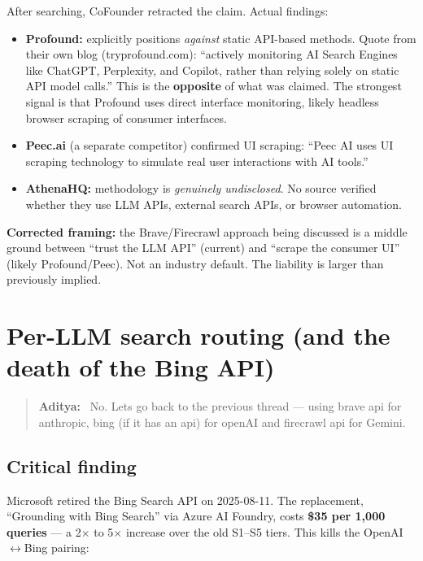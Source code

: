 \documentclass[11pt,letterpaper]{article}
\newenvironment{userturn}
  {\begin{quote}\small\color{brand}\textbf{Aditya:}~}
  {\end{quote}}
\begin{document}
After searching, CoFounder retracted the claim. Actual findings:

\begin{itemize}[nosep]
  \item \textbf{Profound:} explicitly positions \textit{against} static API-based methods.
    Quote from their own blog (tryprofound.com): ``actively monitoring AI Search
    Engines like ChatGPT, Perplexity, and Copilot, rather than relying solely
    on static API model calls.'' This is the \textbf{opposite} of what was
    claimed. The strongest signal is that Profound uses direct interface
    monitoring, likely headless browser scraping of consumer interfaces.
  \item \textbf{Peec.ai} (a separate competitor) confirmed UI scraping: ``Peec AI
    uses UI scraping technology to simulate real user interactions with AI
    tools.''
  \item \textbf{AthenaHQ:} methodology is \textit{genuinely undisclosed}. No
    source verified whether they use LLM APIs, external search APIs, or
    browser automation.
\end{itemize}

\textbf{Corrected framing:} the Brave/Firecrawl approach being discussed is
a middle ground between ``trust the LLM API'' (current) and ``scrape the
consumer UI'' (likely Profound/Peec). Not an industry default. The liability
is larger than previously implied.

\section{Per-LLM search routing (and the death of the Bing API)}

\begin{userturn}
No. Lets go back to the previous thread --- using brave api for anthropic,
bing (if it has an api) for openAI and firecrawl api for Gemini.
\end{userturn}

\subsection{Critical finding}

Microsoft retired the Bing Search API on 2025-08-11. The replacement,
``Grounding with Bing Search'' via Azure AI Foundry, costs
\textbf{\$35 per 1,000 queries} --- a 2$\times$ to 5$\times$ increase over
the old S1--S5 tiers. This kills the OpenAI$\leftrightarrow$Bing pairing:
\end{document}
